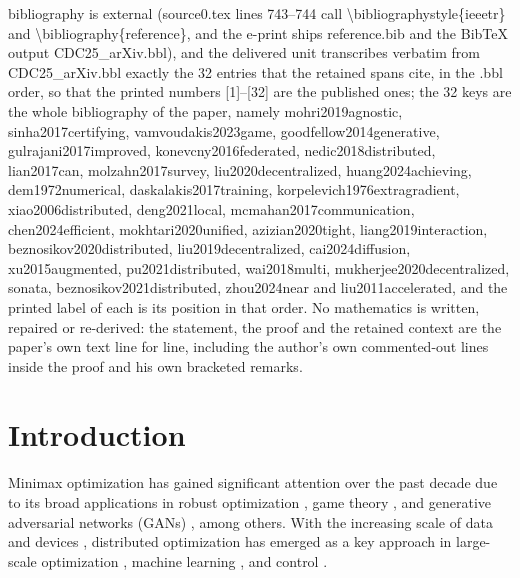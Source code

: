 \documentclass[10pt,a4paper]{amsart}
\begin{document}
bibliography is external (source0.tex lines 743--744 call \textbackslash{}bibliographystyle\{ieeetr\} and \textbackslash{}bibliography\{reference\}, and the e-print ships reference.bib and the BibTeX output CDC25\_arXiv.bbl), and the delivered unit transcribes verbatim from CDC25\_arXiv.bbl exactly the 32 entries that the retained spans cite, in the .bbl order, so that the printed numbers [1]--[32] are the published ones; the 32 keys are the whole bibliography of the paper, namely mohri2019agnostic, sinha2017certifying, vamvoudakis2023game, goodfellow2014generative, gulrajani2017improved, konevcny2016federated, nedic2018distributed, lian2017can, molzahn2017survey, liu2020decentralized, huang2024achieving, dem1972numerical, daskalakis2017training, korpelevich1976extragradient, xiao2006distributed, deng2021local, mcmahan2017communication, chen2024efficient, mokhtari2020unified, azizian2020tight, liang2019interaction, beznosikov2020distributed, liu2019decentralized, cai2024diffusion, xu2015augmented, pu2021distributed, wai2018multi, mukherjee2020decentralized, sonata, beznosikov2021distributed, zhou2024near and liu2011accelerated, and the printed label of each is its position in that order. No mathematics is written, repaired or re-derived: the statement, the proof and the retained context are the paper's own text line for line, including the author's own commented-out lines inside the proof and his own bracketed remarks.
\section{Introduction}


Minimax optimization has gained significant attention over the past decade due to its broad applications in robust optimization \cite{mohri2019agnostic, sinha2017certifying}, game theory \cite{vamvoudakis2023game}, and generative adversarial networks (GANs) \cite{goodfellow2014generative, gulrajani2017improved}, among others.
With the increasing scale of data and devices \cite{konevcny2016federated}, distributed optimization has emerged as a key approach in large-scale optimization \cite{nedic2018distributed}, machine learning \cite{lian2017can}, and control \cite{molzahn2017survey}.
\end{document}
